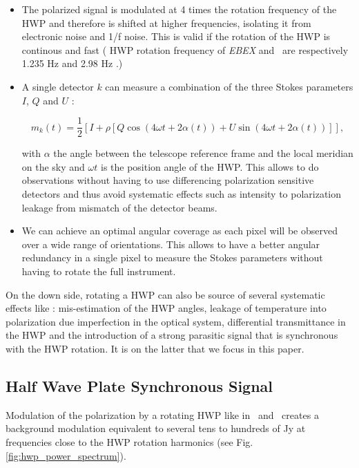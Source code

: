 \begin{itemize}
\item The polarized signal is modulated at 4 times the rotation frequency of the HWP and therefore is shifted at higher frequencies, isolating it from electronic noise and 1/f noise. This is valid if the rotation of the HWP is continous and fast ( HWP rotation frequency of \emph{EBEX} and \nika\ are respectively 1.235 Hz \citep{2018ApJS..239....7T} and 2.98 Hz \citep{2017A&A...599A..34R}.)

\item A single detector $k$ can measure a combination of the three Stokes parameters $I$, $Q$ and $U$ :

\begin{equation}
\label{eq:polar_measure}
m_{k}(t) = \frac{1}{2} [I + \rho [Q \cos (4 \omega t + 2 \alpha(t)) + U \sin (4 \omega t + 2 \alpha(t))]],
\end{equation}

with $\alpha$ the angle between the telescope reference frame and the local meridian on the sky and $\omega t$ is the position angle of the HWP.
This allows to do observations without having to use differencing polarization sensitive detectors and thus avoid systematic effects such as intensity to polarization leakage from mismatch of the detector beams.

\item We can achieve an optimal angular coverage as each pixel will be observed over a wide range of orientations. This allows to have a better angular redundancy in a single pixel to measure the Stokes parameters without having to rotate the full instrument.
\end{itemize}

On the down side, rotating a HWP can also be source of several systematic effects like : mis-estimation of the HWP angles, leakage of temperature into polarization due imperfection in the optical system, differential transmittance in the HWP \citep{2009MNRAS.397..634B,2018SPIE10708E..48S} and the introduction of a strong parasitic signal that is synchronous with the HWP rotation. It is on the latter that we focus in this paper.

\subsection{Half Wave Plate Synchronous Signal}

Modulation of the polarization by a rotating HWP like in \nika\ and \nikad\ creates a background modulation equivalent to several tens to hundreds of Jy at frequencies close to the HWP rotation harmonics \citep{2017A&A...599A..34R} (see Fig. \ref{fig:hwp_power_spectrum}).

